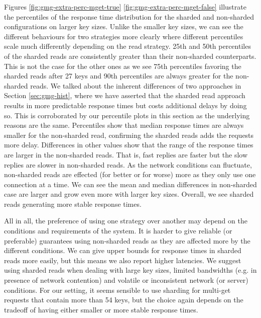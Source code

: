 \documentclass[11pt,a4paper]{article}
\begin{document}
\par Figures \ref{fig:gmg-extra-perc-mget-true} \ref{fig:gmg-extra-perc-mget-false} illustrate the percentiles of the response time distribution for the sharded and non-sharded configurations on larger key sizes. Unlike the smaller key sizes, we can see the different behaviours for two strategies more clearly where different percentiles scale much differently depending on the read strategy. 25th and 50th percentiles of the sharded reads are consistently greater than their non-sharded counterparts. This is not the case for the other ones as we see 75th percentiles favoring the sharded reads after 27 keys and 90th percentiles are always greater for the non-sharded reads. We talked about the inherent differences of two approaches in Section \ref{sec:gmg-hist}, where we have asserted that the sharded read approach results in more predictable response times but costs additional delays by doing so. This is corroborated by our percentile plots in this section as the underlying reasons are the same. Percentiles show that median response times are always smaller for the non-sharded read, confirming the sharded reads adds the requests more delay. Differences in other values show that the range of the response times are larger in the non-sharded reads. That is, fast replies are faster but the slow replies are slower in non-sharded reads. As the network conditions can fluctuate, non-sharded reads are effected (for better or for worse) more as they only use one connection at a time. We can see the mean and median differences in non-sharded case are larger and grow even more with larger key sizes. Overall, we see sharded reads generating more stable response times.
\par All in all, the preference of using one strategy over another may depend on the conditions and requirements of the system. It is harder to give reliable (or preferable) guarantees using non-sharded reads as they are affected more by the different conditions. We can give upper bounds for response times in sharded reads more easily, but this means we also report higher latencies. We suggest using sharded reads when dealing with large key sizes, limited bandwidths (e.g. in presence of network contention) and volatile or inconsistent network (or server) conditions. For our setting, it seems sensible to use sharding for multi-get requests that contain more than 54 keys, but the choice again depends on the tradeoff of having either smaller or more stable response times.
\end{document}
